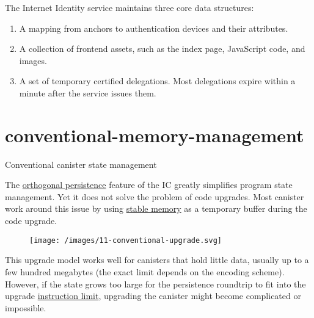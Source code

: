 \documentclass{article}
\begin{document}
The Internet Identity service maintains three core data structures:
\begin{enumerate}
  \item A mapping from anchors to authentication devices and their attributes.
  \item A collection of frontend assets, such as the index page, JavaScript code, and images.
  \item A set of temporary certified delegations. Most delegations expire within a minute after the service issues them.
\end{enumerate}

\section{conventional-memory-management}{Conventional canister state management}

The \href{/posts/06-ic-orthogonal-persistence.html}{orthogonal persistence} feature of the IC greatly simplifies program state management.
Yet it does not solve the problem of code upgrades.
Most canister work around this issue by using \href{https://internetcomputer.org/docs/current/references/ic-interface-spec/#system-api-stable-memory}{stable memory} as a temporary buffer during the code upgrade.

\begin{figure}[grayscale-diagram]
  \texttt{[image: /images/11-conventional-upgrade.svg]}
\end{figure}

This upgrade model works well for canisters that hold little data, usually up to a few hundred megabytes (the exact limit depends on the encoding scheme).
However, if the state grows too large for the persistence roundtrip to fit into the upgrade \href{/posts/01-effective-rust-canisters.html#instruction-counter}{instruction limit}, upgrading the canister might become complicated or impossible.
\end{document}
